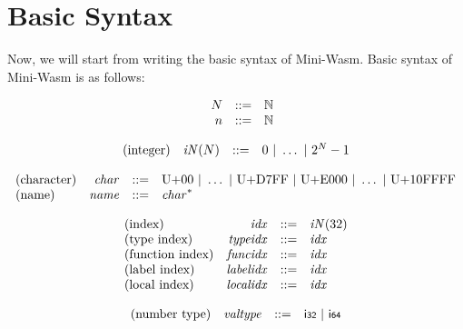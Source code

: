 \documentclass{article}
\begin{document}
\section{Basic Syntax}
Now, we will start from writing the basic syntax of Mini-Wasm.
Basic syntax of Mini-Wasm is as follows:

$$
\begin{array}{@{}lrrl@{}l@{}}
	& N &::=& \mathbb{N} \\
	& n &::=& \mathbb{N} \\
\end{array}
$$

\vspace{1ex}

$$
\begin{array}{@{}lrrl@{}l@{}}
	\mbox{(integer)} & {\mathit{iN}}(N) &::=& 0 ~|~ \dots ~|~ {2^{N}} - 1 \\
\end{array}
$$

\vspace{1ex}

$$
\begin{array}{@{}lrrl@{}l@{}}
	\mbox{(character)} & {\mathit{char}} &::=& \mathrm{U{+}00} ~|~ \dots ~|~ \mathrm{U{+}D7FF} ~|~ \mathrm{U{+}E000} ~|~ \dots ~|~ \mathrm{U{+}10FFFF} \\
	\mbox{(name)} & {\mathit{name}} &::=& {{\mathit{char}}^\ast} \\
\end{array}
$$

\vspace{1ex}

$$
\begin{array}{@{}lrrl@{}l@{}}
	\mbox{(index)} & {\mathit{idx}} &::=& {\mathit{iN}}(32) \\
	\mbox{(type index)} & {\mathit{typeidx}} &::=& {\mathit{idx}} \\
	\mbox{(function index)} & {\mathit{funcidx}} &::=& {\mathit{idx}} \\
	\mbox{(label index)} & {\mathit{labelidx}} &::=& {\mathit{idx}} \\
	\mbox{(local index)} & {\mathit{localidx}} &::=& {\mathit{idx}} \\
\end{array}
$$

\vspace{1ex}

$$
\begin{array}{@{}lrrl@{}l@{}}
	\mbox{(number type)} & {\mathit{valtype}} &::=& \mathsf{i{\scriptstyle 32}} ~|~ \mathsf{i{\scriptstyle 64}} \\
\end{array}
$$
\end{document}
